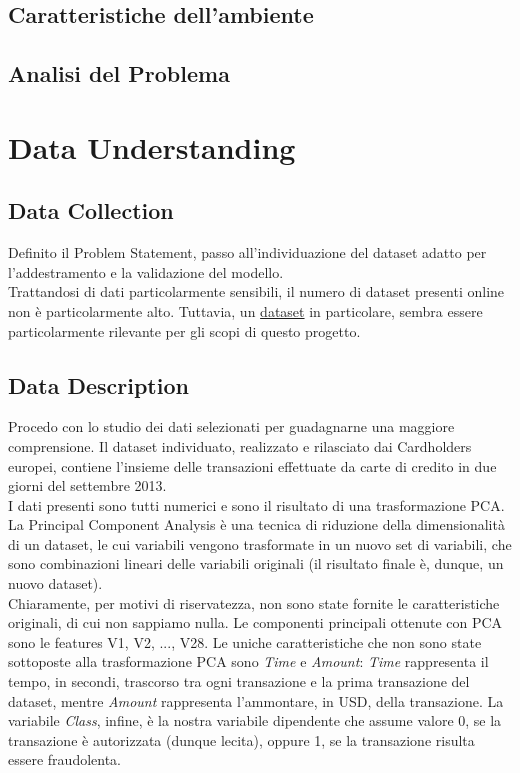 \documentclass[]{article}
\begin{document}
    \subsection{Caratteristiche dell'ambiente}

    \subsection{Analisi del Problema}

\section{Data Understanding}
    \subsection{Data Collection}
        Definito il Problem Statement, passo all'individuazione del dataset adatto per l'addestramento e la validazione del modello.\\
        Trattandosi di dati particolarmente sensibili, il numero di dataset presenti online non è particolarmente alto. Tuttavia, un \href{https://www.kaggle.com/datasets/mlg-ulb/creditcardfraud}{dataset} in particolare, sembra essere particolarmente rilevante per gli scopi di questo progetto.

    \subsection{Data Description}
        Procedo con lo studio dei dati selezionati per guadagnarne una maggiore comprensione. Il dataset individuato, realizzato e rilasciato dai Cardholders europei, contiene l'insieme delle transazioni effettuate da carte di credito in due giorni del settembre 2013.\\
        I dati presenti sono tutti numerici e sono il risultato di una trasformazione PCA. La Principal Component Analysis è una tecnica di riduzione della dimensionalità di un dataset, le cui variabili vengono trasformate in un nuovo set di variabili, che sono combinazioni lineari delle variabili originali (il risultato finale è, dunque, un nuovo dataset).\\
        Chiaramente, per motivi di riservatezza, non sono state fornite le caratteristiche originali, di cui non sappiamo nulla. Le componenti principali ottenute con PCA sono le features V1, V2, ..., V28. Le uniche caratteristiche che non sono state sottoposte alla trasformazione PCA sono \textit{Time} e \textit{Amount}: \textit{Time} rappresenta il tempo, in secondi, trascorso tra ogni transazione e la prima transazione del dataset, mentre \textit{Amount} rappresenta l'ammontare, in USD, della transazione. La variabile \textit{Class}, infine, è la nostra variabile dipendente che assume valore 0, se la transazione è autorizzata (dunque lecita), oppure 1, se la transazione risulta essere fraudolenta.\\
\end{document}
